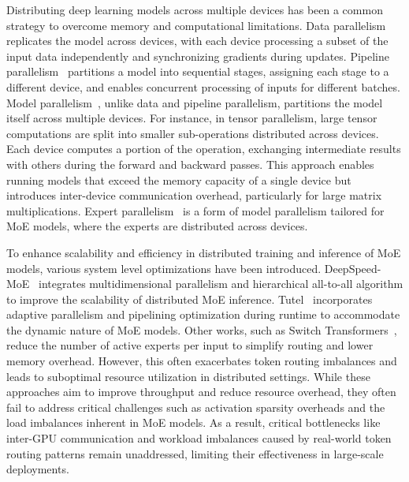 Distributing deep learning models across multiple devices has been a common strategy to overcome memory and computational limitations. 
%
Data parallelism~\cite{li2020pytorch,zhao2023pytorch} replicates the model across devices, with each device processing a subset of the input data independently and synchronizing gradients during updates.
%
Pipeline parallelism~\cite{huang2019gpipe,narayanan2019pipedream,narayanan2021memory} partitions a model into sequential stages, assigning each stage to a different device, and enables concurrent processing of inputs for different batches.
%
Model parallelism~\cite{megatron, switchtransformer}, unlike data and pipeline parallelism, partitions the model itself across multiple devices.
%
For instance, in tensor parallelism, large tensor computations are split into smaller sub-operations distributed across devices. 
%
Each device computes a portion of the operation, exchanging intermediate results with others during the forward and backward passes. 
%
This approach enables running models that exceed the memory capacity of a single device but introduces inter-device communication overhead, particularly for large matrix multiplications.
%
Expert parallelism~\cite{switchtransformer,deepspeed-moe,cai2024shortcut,chen2022ta} is a form of model parallelism tailored for MoE models, where the experts are distributed across devices.

To enhance scalability and efficiency in distributed training and inference of MoE models, various system level optimizations have been introduced.
%
DeepSpeed-MoE~\cite{deepspeed-moe} integrates multidimensional parallelism and hierarchical all-to-all algorithm to improve the scalability of distributed MoE inference.
%
Tutel~\cite{hwang2023tutel} incorporates adaptive parallelism and pipelining optimization during runtime to accommodate the dynamic nature of MoE models.
%
Other works, such as Switch Transformers~\cite{switchtransformer}, reduce the number of active experts per input to simplify routing and lower memory overhead. 
%
However, this often exacerbates token routing imbalances and leads to suboptimal resource utilization in distributed settings.
%
While these approaches aim to improve throughput and reduce resource overhead, they often fail to address critical challenges such as activation sparsity overheads and the load imbalances inherent in MoE models.
%
As a result, critical bottlenecks like inter-GPU communication and workload imbalances caused by real-world token routing patterns remain unaddressed, limiting their effectiveness in large-scale deployments.

